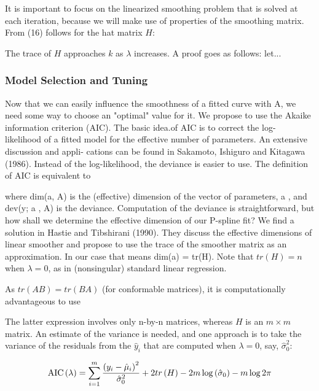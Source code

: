\documentclass[12pt]{article}
\newcommand*\needsparaphrased{\color{red}}
\newcommand*\outlineskeleton{\color{green}}
\begin{document}
{{It is important to focus on the linearized smoothing problem that is solved at each iteration, because we will make use of properties of the smoothing matrix. From (16) follows for the hat matrix $H$:}

{\needsparaphrased The trace of $H$ approaches $k$ as $\lambda$ increases. A proof goes as follows: let...}

\subsubsection{{\outlineskeleton Model Selection and Tuning}}
{\needsparaphrased  Now that we can easily influence the smoothness of a fitted curve with A, we need some way to choose an "optimal" value for it. We propose to use the Akaike information criterion (AIC). The basic idea.of AIC is to correct the log- likelihood of a fitted model for the effective number of parameters. An extensive discussion and appli- cations can be found in Sakamoto, Ishiguro and Kitagawa (1986). Instead of the log-likelihood, the deviance is easier to use. The definition of AIC is equivalent to}

{\needsparaphrased where dim(a, A) is the (effective) dimension of the vector of parameters, a , and dev(y; a , A) is the deviance.
Computation of the deviance is straightforward, but how shall we determine the effective dimension of our P-spline fit? We find a solution in Hastie and Tibshirani (1990). They discuss the effective dimensions of linear smoother and propose to use the trace of the smoother matrix as an approximation. In our case that means dim(a) = tr(H). Note that $tr\left(H\right) = n$ when $\lambda = 0$, as in (nonsingular) standard linear regression. 

As $tr\left(AB\right) = tr\left(BA\right)$ (for conformable matrices), it is computationally advantageous to use}

{\needsparaphrased The latter expression involves only n-by-n matrices, whereas $H$ is an $m \times m$ matrix. An estimate of the variance is needed, and one approach is to take the variance of the residuals from the $\hat{y}_i$ that are computed when $\lambda = 0$, say, $\hat{\sigma}_0^2$:}

\begin{equation} \label{eq:univariate_AIC}
\textup{AIC}\left(\lambda\right) = \sum_{i=1}^m \frac{\left( y_i - \hat{\mu}_i \right)^2}{\hat{\sigma}_0^2} + 2tr\left(H\right) - 2m\log\left(\hat{\sigma}_0\right) - m\log 2\pi
\end{equation}

}
\end{document}

